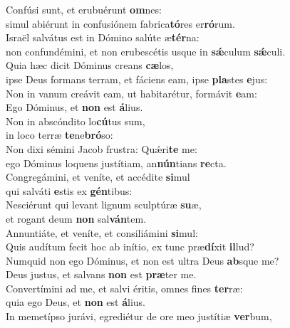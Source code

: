 \evenverse Confúsi sunt, et erubuérunt \textbf{om}nes:~\*\\
\evenverse simul abiérunt in confusiónem fabrica\textbf{tó}res er\textbf{ró}rum.\\
\oddverse Israël salvátus est in Dómino salúte æ\textbf{tér}na:~\*\\
\oddverse non confundémini, et non erubescétis usque in \textbf{sǽ}culum \textbf{sǽ}culi.\\
\evenverse Quia hæc dicit Dóminus creans \textbf{cæ}los,~\*\\
\evenverse ipse Deus formans terram, et fáciens eam, ipse \textbf{pla}stes \textbf{e}jus:\\
\oddverse Non in vanum creávit eam, ut habitarétur, formávit \textbf{e}am:~\*\\
\oddverse Ego Dóminus, et \textbf{non} est \textbf{á}lius.\\
\evenverse Non in abscóndito lo\textbf{cú}tus sum,~\*\\
\evenverse in loco terræ \textbf{te}ne\textbf{bró}so:\\
\oddverse Non dixi sémini Jacob frustra: Quǽri\textbf{te} me:~\*\\
\oddverse ego Dóminus loquens justítiam, an\textbf{nún}tians \textbf{re}cta.\\
\evenverse Congregámini, et veníte, et accédite \textbf{si}mul~\*\\
\evenverse qui salváti \textbf{e}stis ex \textbf{gén}tibus:\\
\oddverse Nesciérunt qui levant lignum sculptúræ \textbf{su}æ,~\*\\
\oddverse et rogant deum \textbf{non} sal\textbf{ván}tem.\\
\evenverse Annuntiáte, et veníte, et consiliámini \textbf{si}mul:~\*\\
\evenverse Quis audítum fecit hoc ab inítio, ex tunc præ\textbf{dí}xit \textbf{il}lud?\\
\oddverse Numquid non ego Dóminus, et non est ultra Deus \textbf{ab}sque me?~\*\\
\oddverse Deus justus, et salvans \textbf{non} est \textbf{præ}ter me.\\
\evenverse Convertímini ad me, et salvi éritis, omnes fines \textbf{ter}ræ:~\*\\
\evenverse quia ego Deus, et \textbf{non} est \textbf{á}lius.\\
\oddverse In memetípso jurávi, egrediétur de ore meo justítiæ \textbf{ver}bum,~\*\\
